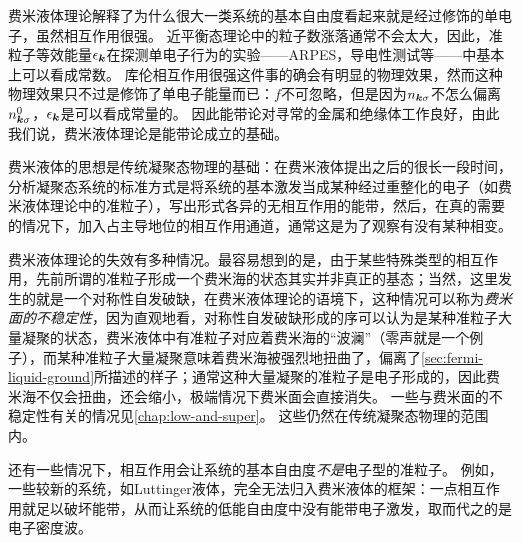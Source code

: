 费米液体理论解释了为什么很大一类系统的基本自由度看起来就是经过修饰的单电子，虽然相互作用很强。
近平衡态理论中的粒子数涨落通常不会太大，因此，准粒子等效能量$\epsilon_{\vb*{k}}$在探测单电子行为的实验——ARPES，导电性测试等——中基本上可以看成常数。
库伦相互作用很强这件事的确会有明显的物理效果，然而这种物理效果只不过是修饰了单电子能量而已：$f$不可忽略，但是因为$n_{\vb*{k} \sigma}$不怎么偏离$n^0_{\vb*{k} \sigma}$，$\epsilon_{\vb*{k}}$是可以看成常量的。
因此能带论对寻常的金属和绝缘体工作良好，由此我们说，费米液体理论是能带论成立的基础。

费米液体的思想是传统凝聚态物理的基础：在费米液体提出之后的很长一段时间，分析凝聚态系统的标准方式是将系统的基本激发当成某种经过重整化的电子（如费米液体理论中的准粒子），写出形式各异的无相互作用的能带，然后，在真的需要的情况下，加入占主导地位的相互作用通道，通常这是为了观察有没有某种相变。

费米液体理论的失效有多种情况。最容易想到的是，由于某些特殊类型的相互作用，先前所谓的准粒子形成一个费米海的状态其实并非真正的基态；当然，这里发生的就是一个对称性自发破缺，在费米液体理论的语境下，这种情况可以称为\emph{费米面的不稳定性}，因为直观地看，对称性自发破缺形成的序可以认为是某种准粒子大量凝聚的状态，费米液体中有准粒子对应着费米海的“波澜”（零声就是一个例子），而某种准粒子大量凝聚意味着费米海被强烈地扭曲了，偏离了\autoref{sec:fermi-liquid-ground}所描述的样子；通常这种大量凝聚的准粒子是电子形成的，因此费米海不仅会扭曲，还会缩小，极端情况下费米面会直接消失。
一些与费米面的不稳定性有关的情况见\autoref{chap:low-and-super}。
这些仍然在传统凝聚态物理的范围内。

还有一些情况下，相互作用会让系统的基本自由度\emph{不是}电子型的准粒子。
例如，一些较新的系统，如Luttinger液体，完全无法归入费米液体的框架：一点相互作用就足以破坏能带，从而让系统的低能自由度中没有能带电子激发，取而代之的是电子密度波。
